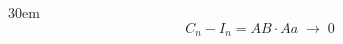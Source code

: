 \documentclass[border=4pt]{standalone}
\begin{document}
\begin{varwidth}{30em}
\large
\[ C_n-I_n=AB\cdot Aa \;\longrightarrow\; 0 \]

\end{varwidth}
\end{document}
